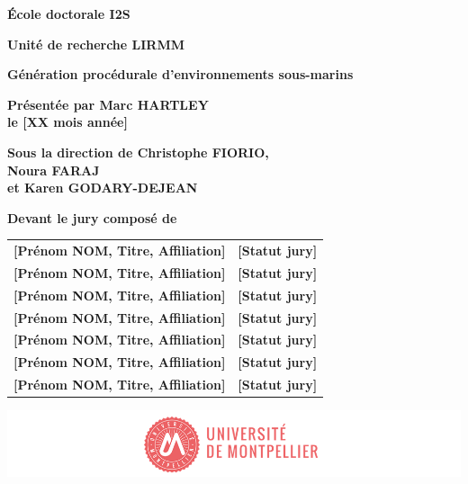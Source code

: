 \begin{titlepage}
{		\bigskip
		\textbf{École doctorale I2S}
		
		\bigskip
		\textbf{Unité de recherche LIRMM}
		
		
		\color{Titleblue}
		\fontsize{17}{20.4}\selectfont
		\vspace{2cm}
		\textbf{Génération procédurale d'environnements sous-marins}
		
		
		\vspace{4cm}
		\fontsize{15}{18}\selectfont
		\color{black}
		\textbf{Présentée par Marc HARTLEY \\
			le [XX mois année]}
		
		\bigskip
		\fontsize{13}{15.6}\selectfont
		\textbf{Sous la direction de Christophe FIORIO, \\
			Noura FARAJ \\
			et Karen GODARY-DEJEAN}
		
		\vspace{1.5cm}
		\normalsize
		\textbf{Devant le jury composé de}\\
		\bigskip
		\fontsize{10}{12}\selectfont
		\vspace{1.5mm}
		\begin{tabular}{p{14cm}l}
			\textbf{[Prénom NOM, Titre, Affiliation]} & \textbf{[Statut jury]} \\
			\textbf{[Prénom NOM, Titre, Affiliation]} & \textbf{[Statut jury]} \\
			\textbf{[Prénom NOM, Titre, Affiliation]} & \textbf{[Statut jury]} \\
			\textbf{[Prénom NOM, Titre, Affiliation]} & \textbf{[Statut jury]} \\
			\textbf{[Prénom NOM, Titre, Affiliation]} & \textbf{[Statut jury]} \\
			\textbf{[Prénom NOM, Titre, Affiliation]} & \textbf{[Statut jury]} \\
			\textbf{[Prénom NOM, Titre, Affiliation]} & \textbf{[Statut jury]} \\
		\end{tabular} 
		
		\vspace{\fill}
		\includegraphics[scale=1]{images/PhD_Couverture_LogoUM.png}
		\vspace{-15mm}}
\end{titlepage}

